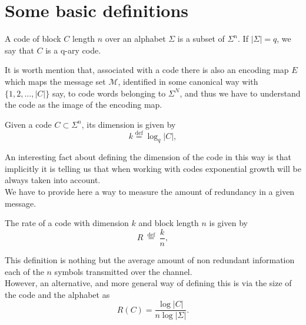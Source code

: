 \section{Some basic definitions}
\begin{definition}[Code]
A code of block $C$ length $n$ over an alphabet $\Sigma$ is a subset of $\Sigma^n$.  If $|\Sigma|=q$, we say that $C$ is a q-ary code.
\end{definition}
\indent It is worth mention that, associated with a code there is also an encoding map $E$ which maps the message set $\mathcal{M}$, identified in some canonical way with $\{1,2,\ldots,|C|\}$ say, to code words belonging to $\Sigma^N$, and thus we have to understand the code as the image of the encoding map\cite{jaynes_probability_2003}.
\begin{definition}
Given a code $C\subset\Sigma^n$, its dimension is given by
  \begin{equation}
  k \stackrel{\mathrm{def}}{=} \log _{q}|C|,
  \label{CH2:diemnsion_of_code}
  \end{equation}
 \end{definition}
\indent An interesting fact about defining  the dimension of the code in this way is that implicitly it is telling us that when working with codes exponential growth will be always taken into account.\\

\indent We have to provide here a way to measure the amount of redundancy in a given message.
	\begin{definition}
	The rate of a code with dimension $k$ and block length $n$ is given by 
	\begin{equation}
		R \stackrel{\text { def }}{=} \frac{k}{n},
		\label{CH2:Rate_of_code}
	\end{equation}
	\end{definition}
\indent This definition is nothing but the average amount of non redundant information each of the $n$ symbols transmitted over the channel.\\ However, an alternative, and more general way of defining this is via the size of the code and the alphabet as
\begin{equation}
R(C)=\frac{\log |C|}{n \log |\Sigma|}.
\end{equation}

